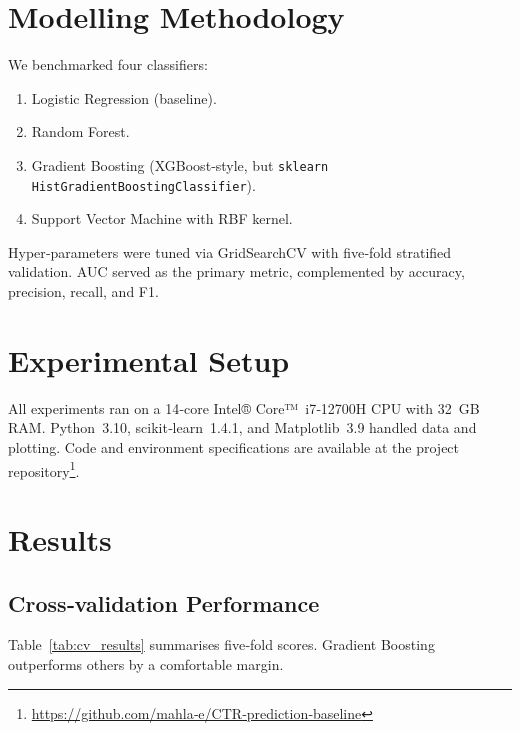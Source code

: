 \documentclass[12pt]{article}
\begin{document}
\section{Modelling Methodology}\label{sec:method}
We benchmarked four classifiers:
\begin{enumerate}[label=\arabic*., noitemsep]
  \item Logistic Regression (baseline).
  \item Random Forest.
  \item Gradient Boosting (XGBoost‑style, but \texttt{sklearn} \texttt{HistGradientBoostingClassifier}).
  \item Support Vector Machine with RBF kernel.
\end{enumerate}
Hyper‑parameters were tuned via GridSearchCV with five‑fold stratified validation. AUC served as the primary metric, complemented by accuracy, precision, recall, and F1.

\section{Experimental Setup}\label{sec:experiments}
All experiments ran on a 14‑core Intel® Core™ i7‑12700H CPU with 32 GB RAM. Python 3.10, scikit‑learn 1.4.1, and Matplotlib 3.9 handled data and plotting. Code and environment specifications are available at the project repository\footnote{\url{https://github.com/mahla‑e/CTR‑prediction‑baseline}}.

\section{Results}\label{sec:results}
\subsection{Cross‑validation Performance}
Table~\ref{tab:cv_results} summarises five‑fold scores. Gradient Boosting outperforms others by a comfortable margin.
\end{document}
